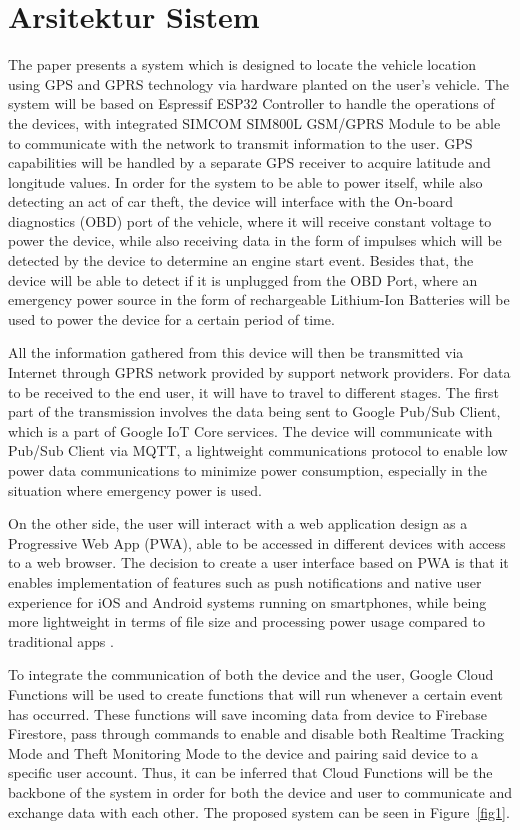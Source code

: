 \documentclass[conference]{IEEEtran}
\begin{document}
\section{Arsitektur Sistem}
The paper presents a system which is designed to locate the vehicle location using GPS and GPRS technology via hardware planted on the user's vehicle. The system will be based on Espressif ESP32 Controller to handle the operations of the devices, with integrated SIMCOM SIM800L GSM/GPRS Module to be able to communicate with the network to transmit information to the user. GPS capabilities will be handled by a separate GPS receiver to acquire latitude and longitude values. In order for the system to be able to power itself, while also detecting an act of car theft, the device will interface with the On-board diagnostics (OBD) port of the vehicle, where it will receive constant voltage to power the device, while also receiving data in the form of impulses which will be detected by the device to determine an engine start event. Besides that, the device will be able to detect if it is unplugged from the OBD Port, where an emergency power source in the form of rechargeable Lithium-Ion Batteries will be used to power the device for a certain period of time. 

All the information gathered from this device will then be transmitted via Internet through GPRS network provided by support network providers. For data to be received to the end user, it will have to travel to different stages. The first 
part of the transmission involves the data being sent to Google Pub/Sub Client, which is a part of Google IoT Core services. The device will communicate with Pub/Sub Client via MQTT, a lightweight communications protocol to enable low power data communications to minimize power consumption, especially in the situation where emergency power is used. 

On the other side, the user will interact with a web application design as a Progressive Web App (PWA), able to be accessed in different devices with access to a web browser. 
The decision to create a user interface based on PWA is that it enables implementation of features such as push notifications and native user experience for iOS and Android systems running on smartphones, while being more lightweight in terms of file size and processing power usage compared to traditional apps \cite{8456349}.

To integrate the communication of both the device and the user, Google Cloud Functions will be used to create functions that will run whenever a certain event has occurred. These functions will save incoming data from device to Firebase Firestore, pass through commands to enable and disable both Realtime Tracking Mode and Theft Monitoring Mode to the device and pairing said device to a specific user account. Thus, it can be inferred that Cloud Functions will be the  backbone of the system in order for both the device and user to communicate and exchange data with each other. The proposed system can be seen in Figure~\ref{fig1}. 
\end{document}
